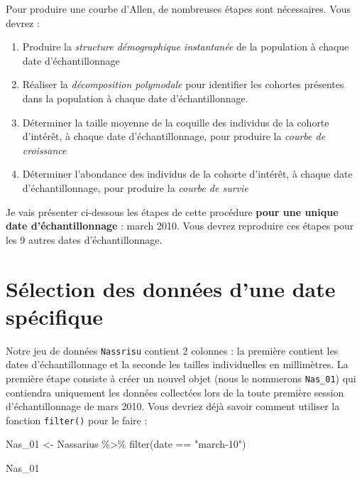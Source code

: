 \documentclass[
  a4paper,
  DIV=11,
  numbers=noendperiod,
  oneside]{scrreprt}
\newenvironment{Shaded}{}{}
\newcommand{\FunctionTok}[1]{\textcolor[rgb]{0.44,0.26,0.76}{#1}}
\newcommand{\NormalTok}[1]{\textcolor[rgb]{0.14,0.16,0.18}{#1}}
\newcommand{\OtherTok}[1]{\textcolor[rgb]{0.44,0.26,0.76}{#1}}
\newcommand{\SpecialCharTok}[1]{\textcolor[rgb]{0.00,0.36,0.77}{#1}}
\newcommand{\StringTok}[1]{\textcolor[rgb]{0.01,0.18,0.38}{#1}}
\providecommand{\tightlist}{%
  \setlength{\itemsep}{0pt}\setlength{\parskip}{0pt}}\usepackage{longtable,booktabs,array}
\begin{document}
Pour produire une courbe d'Allen, de nombreuses étapes sont nécessaires.
Vous devrez :

\begin{enumerate}
\def\labelenumi{\arabic{enumi}.}
\tightlist
\item
  Produire la \emph{structure démographique instantanée} de la
  population à chaque date d'échantillonnage
\item
  Réaliser la \emph{décomposition polymodale} pour identifier les
  cohortes présentes dans la population à chaque date d'échantillonnage.
\item
  Déterminer la taille moyenne de la coquille des individus de la
  cohorte d'intérêt, à chaque date d'échantillonnage, pour produire la
  \emph{courbe de croissance}
\item
  Déterminer l'abondance des individus de la cohorte d'intérêt, à chaque
  date d'échantillonnage, pour produire la \emph{courbe de survie}
\end{enumerate}

Je vais présenter ci-dessous les étapes de cette procédure \textbf{pour
une unique date d'échantillonnage} : march 2010. Vous devrez reproduire
ces étapes pour les 9 autres dates d'échantillonnage.

\hypertarget{suxe9lection-des-donnuxe9es-dune-date-spuxe9cifique}{%
\section{Sélection des données d'une date
spécifique}\label{suxe9lection-des-donnuxe9es-dune-date-spuxe9cifique}}

Notre jeu de données \texttt{Nassrisu} contient 2 colonnes : la première
contient les dates d'échantillonnage et la seconde les tailles
individuelles en millimètres. La première étape consiste à créer un
nouvel objet (nous le nommerons \texttt{Nas\_01}) qui contiendra
uniquement les données collectées lors de la toute première session
d'échantillonnage de mars 2010. Vous devriez déjà savoir comment
utiliser la fonction \texttt{filter()} pour le faire :

\begin{Shaded}
\begin{Highlighting}[]
\NormalTok{Nas\_01 }\OtherTok{\textless{}{-}}\NormalTok{ Nassarius }\SpecialCharTok{\%\textgreater{}\%}
  \FunctionTok{filter}\NormalTok{(date }\SpecialCharTok{==} \StringTok{"march{-}10"}\NormalTok{)}

\NormalTok{Nas\_01}
\end{Highlighting}
\end{Shaded}
\end{document}
